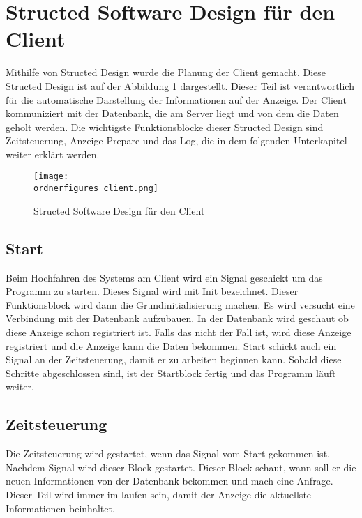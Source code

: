 
\section{Structed Software Design für den Client}

Mithilfe von Structed Design wurde die Planung der Client gemacht. Diese Structed Design ist auf der Abbildung \ref{fi:structed_design_client} dargestellt. 
Dieser Teil ist verantwortlich f\"{u}r die automatische Darstellung der Informationen auf der Anzeige. Der Client kommuniziert mit der Datenbank, die am Server liegt und von dem die Daten geholt werden. Die wichtigste Funktionsbl\"{o}cke dieser Structed Design sind Zeitsteuerung, Anzeige Prepare und das Log, die in dem folgenden Unterkapitel weiter erkl\"{a}rt werden.

\begin{figure}[ht]
	\centering
	\texttt{[image: \\ordnerfigures client.png]}
	\caption{Structed Software Design für den Client}
	\label{fi:structed_design_client}
\end{figure}

\subsection{Start}
Beim Hochfahren des Systems am Client wird ein Signal geschickt um das Programm zu starten. Dieses Signal wird mit Init bezeichnet. Dieser Funktionsblock wird dann die Grundinitialisierung machen. Es wird versucht eine Verbindung mit der Datenbank aufzubauen. In der Datenbank wird geschaut ob diese Anzeige schon registriert ist. Falls das nicht der Fall ist, wird diese Anzeige registriert und die Anzeige kann die Daten bekommen. Start schickt auch ein Signal an der Zeitsteuerung, damit er zu arbeiten beginnen kann. Sobald diese Schritte abgeschlossen sind, ist der Startblock fertig und das Programm l\"{a}uft weiter.

\subsection{Zeitsteuerung}
Die Zeitsteuerung wird gestartet, wenn das Signal vom Start gekommen ist. Nachdem Signal wird dieser Block gestartet. Dieser Block schaut, wann soll er die neuen Informationen von der Datenbank bekommen und mach eine Anfrage. Dieser Teil wird immer im laufen sein, damit der Anzeige die aktuellste Informationen beinhaltet.

